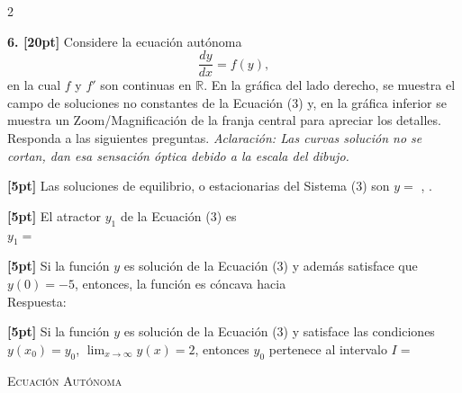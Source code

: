 \documentclass[11pt]{article}
\begin{document}
\begin{multicols}{2}

\textbf{6. [20pt]} Considere la ecuación autónoma
\[
\frac{dy}{dx}=f(y), \tag{3}
\]
en la cual $f$ y $f'$ son continuas en $\mathbb{R}$. En la gráfica del lado derecho, se muestra el campo de soluciones no constantes de la Ecuación (3) y, en la gráfica inferior se muestra un Zoom/Magnificación de la franja central para apreciar los detalles. Responda a las siguientes preguntas. \textit{Aclaración: Las curvas solución no se cortan, dan esa sensación óptica debido a la escala del dibujo.}

\begin{opciones}
\item[(a)] \textbf{[5pt]} Las soluciones de equilibrio, o estacionarias del Sistema (3) son $y=$ \underline{\hspace{1.2cm}}, \underline{\hspace{1.2cm}}.
\item[(b)] \textbf{[5pt]} El atractor $y_1$ de la Ecuación (3) es\\
$y_1=$ \underline{\hspace{2cm}}
\item[(c)] \textbf{[5pt]} Si la función $y$ es solución de la Ecuación (3) y además satisface que $y(0)=-5$, entonces, la función es cóncava hacia\\
Respuesta: \underline{\hspace{2.5cm}}
\item[(d)] \textbf{[5pt]} Si la función $y$ es solución de la Ecuación (3) y satisface las condiciones $y(x_0)=y_0$, $\displaystyle\lim_{x\to\infty} y(x)=2$, entonces $y_0$ pertenece al intervalo $I=$ \underline{\hspace{2.5cm}}
\end{opciones}

\columnbreak

\begin{center}
\textsc{\footnotesize Ecuación Autónoma}\\[2pt]


\end{center}
\end{multicols}
\end{document}
